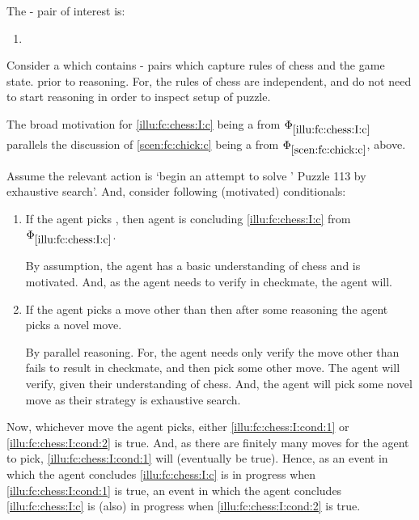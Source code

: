 \begin{note}
  The - pair of interest is:

  \begin{enumerate}[label=C\thescenarioCounter., ref=C\thescenarioCounter]
  \item
    \label{illu:fc:chess:I:c}
  \end{enumerate}
  Consider a \pool{} which contains - pairs which capture rules of chess and the game state.
  \pool{} prior to reasoning.
  For, the rules of chess are independent, and do not need to start reasoning in order to inspect setup of puzzle.

  The broad motivation for \ref{illu:fc:chess:I:c} being a \fc{} from \(\Phi_{\ref{illu:fc:chess:I:c}}\) parallels the discussion of  \ref{scen:fc:chick:c} being a \fc{} from \(\Phi_{\ref{scen:fc:chick:c}}\), above.

  Assume the relevant action is `begin an attempt to solve \citeauthor{Emms:2000aa}' Puzzle 113 by exhaustive search'.
  And, consider following (motivated) conditionals:

  \begin{enumerate}[label=\arabic*., ref=(\arabic*)]
  \item
    \label{illu:fc:chess:I:cond:1}
    If the agent picks , then agent is concluding \ref{illu:fc:chess:I:c} from \(\Phi_{\ref{illu:fc:chess:I:c}}\).
    \smallskip

    By assumption, the agent has a basic understanding of chess and is motivated.
    And, as the agent needs to verify  in checkmate, the agent will.
  \item
    \label{illu:fc:chess:I:cond:2}
    If the agent picks a move other than  then after some reasoning the agent picks a novel move.%
    \smallskip

    By parallel reasoning.
    For, the agent needs only verify the move other than  fails to result in checkmate, and then pick some other move.
    The agent will verify, given their understanding of chess.
    And, the agent will pick some novel move as their strategy is exhaustive search.
  \end{enumerate}
  Now, whichever move the agent picks, either \ref{illu:fc:chess:I:cond:1} or \ref{illu:fc:chess:I:cond:2} is true.
  And, as there are finitely many moves for the agent to pick, \ref{illu:fc:chess:I:cond:1} will (eventually be true).
  Hence, as an event in which the agent concludes \ref{illu:fc:chess:I:c} is in progress when \ref{illu:fc:chess:I:cond:1} is true, an event in which the agent concludes \ref{illu:fc:chess:I:c} is (also) in progress when \ref{illu:fc:chess:I:cond:2} is true.
\end{note}



